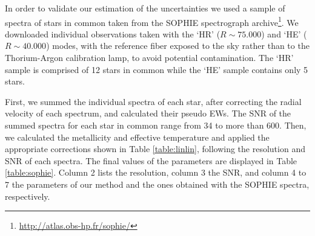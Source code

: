 \documentclass[referee]{aa}
\begin{document}
In order to validate our estimation of the uncertainties we used a sample of spectra of stars in common taken from the SOPHIE spectrograph \citep{Bouchy-2006} archive\footnote{\url{http://atlas.obs-hp.fr/sophie/}}. We downloaded individual observations taken with the `HR' ($R\sim75.000$) and `HE' ($R\sim40.000$) modes, with the reference fiber exposed to the sky rather than to the Thorium-Argon calibration lamp, to avoid potential contamination. The `HR' sample is comprised of 12 stars in common while the `HE' sample contains only 5 stars.

First, we summed the individual spectra of each star, after correcting the radial velocity of each spectrum, and calculated their pseudo EWs. The SNR of the summed spectra for each star in common range from 34 to more than 600. Then, we calculated the metallicity and effective temperature and applied the appropriate corrections shown in Table \ref{table:linlin}, following the resolution and SNR of each spectra. The final values of the parameters are displayed in Table \ref{table:sophie}. Column 2 lists the resolution, column 3 the SNR, and column 4 to 7 the parameters of our method and the ones obtained with the SOPHIE spectra, respectively. %
\end{document}
